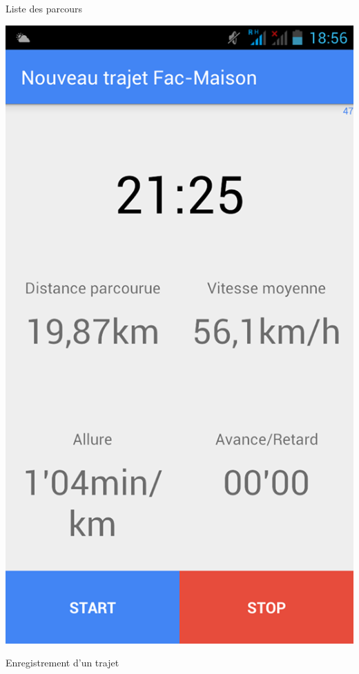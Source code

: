 \begin{appendices}
\begin{multicols}{3}
\begin{img}
  \caption{Liste des parcours}
\end{img}
\begin{img}
  \includegraphics[scale=0.28]{img/direct.jpg}
  \caption{Enregistrement d'un trajet}
\end{img}
\begin{img}

\end{img}
\end{multicols}
\end{appendices}
